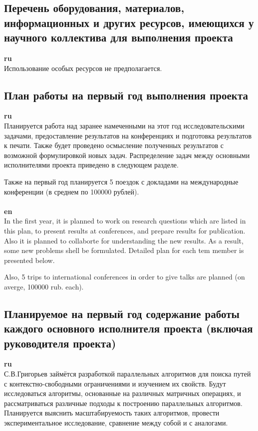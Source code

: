 \documentclass[12pt]{article}  %
\theoremstyle{remark}
\begin{document}
\subsection{Перечень оборудования, материалов, информационных и других ресурсов, имеющихся у научного коллектива для выполнения проекта}
\textbf{ru}\\
%
Использование особых ресурсов не предполагается.

\subsection{План работы на первый год выполнения проекта}

\textbf{ru}\\
%
Планируется работа над заранее намеченными на этот год исследовательскими задачами, предоставление результатов на конференциях и подготовка результатов к печати.
Также будет проведено осмысление полученных результатов с возможной формулировкой новых задач. Распределение задач между основными исполнителями проекта приведено в следующем разделе.

Также на первый год планируется 5 поездок с докладами на международные конференции (в среднем по 100000 рублей).
\\
\\
\textbf{en}\\
In the first year, it is planned to work on research questions which are listed in this plan, to present results at conferences, and prepare results for publication. Also it is planned to collaborte for understanding the new results. As a result, some new problems shell be formulated. Detailed plan for each tem member is presented below.

Also, 5 trips to international conferences in order to give talks are planned (on averge, 100000 rub. each).



\subsection{Планируемое на первый год содержание работы каждого основного исполнителя проекта (включая руководителя проекта)}

\textbf{ru}\\
%
С.В.Григорьев займётся разработкой параллельных алгоритмов для поиска путей с контекстно-свободными ограничениями и изучением их свойств.
Будут исследоваться алгоритмы, основанные на различных матричных операциях, и рассматриваться различные подходы к построению параллельных алгоритмов.
Планируется выяснить масштабируемость таких алгоритмов, провести экспериментальное исследование, сравнение между собой и с аналогами.
\end{document}
